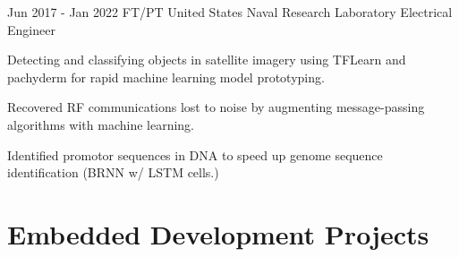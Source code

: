 \documentclass[
	10pt, %
]{FreemanCV}
\begin{document}

\jobentry
	{Jun 2017 - Jan 2022} %
	{FT/PT} %
	{United States Naval Research Laboratory} %
	{Electrical Engineer} %
	{ %
		\item Detecting and classifying objects in satellite imagery using TFLearn and pachyderm for rapid machine learning model prototyping.
		\item Recovered RF communications lost to noise by augmenting message-passing algorithms with machine learning.
		\item Identified promotor sequences in DNA to speed up genome sequence identification (BRNN w/ LSTM cells.)
	} 



\vspace*{-10pt}
\section{Embedded Development Projects}
\setlength{\columnsep}{10pt}
\end{document}
